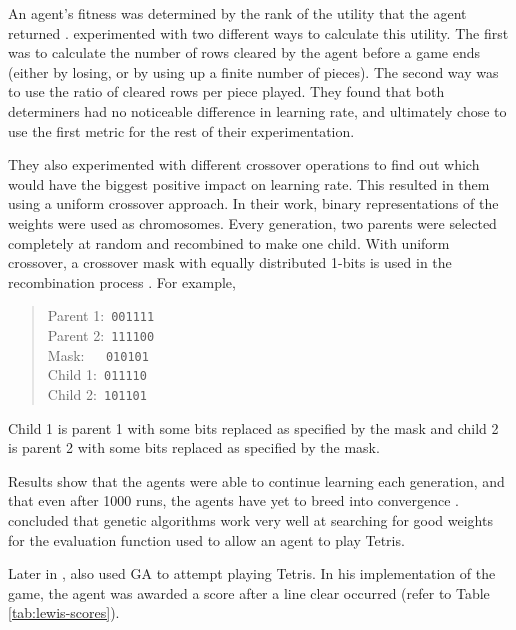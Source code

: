 \documentclass[a4paper, 12pt]{extreport}
\begin{document}
				An agent's fitness was determined by the rank of the utility that the agent returned \cite{tetris-ga-flom-robinson}. \citeauthor{tetris-ga-flom-robinson} experimented with two different ways to calculate this utility. The first was to calculate the number of rows cleared by the agent before a game ends (either by losing, or by using up a finite number of pieces). The second way was to use the ratio of cleared rows per piece played. They found that both determiners had no noticeable difference in learning rate, and ultimately chose to use the first metric for the rest of their experimentation.
				
				They also experimented with different crossover operations to find out which would have the biggest positive impact on learning rate. This resulted in them using a uniform crossover approach. In their work, binary representations of the weights were used as chromosomes. Every generation, two parents were selected completely at random and recombined to make one child. With uniform crossover, a crossover mask with equally distributed 1-bits is used in the recombination process \cite{uniform-crossover}. For example,
				
				\begin{quote}
					Parent 1:\verb| 001111|\\
					Parent 2:\verb| 111100|\\
					Mask:\hspace{4pt}\verb|   010101|\\
					Child 1:\hspace{6pt}\verb| 011110|\\
					Child 2:\hspace{6pt}\verb| 101101|
				\end{quote}
				
				\noindent Child 1 is parent 1 with some bits replaced as specified by the mask and child 2 is parent 2 with some bits replaced as specified by the mask.
				
				Results show that the agents were able to continue learning each generation, and that even after 1000 runs, the agents have yet to breed into convergence  \cite{tetris-ga-flom-robinson}. \citeauthor{tetris-ga-flom-robinson} concluded that genetic algorithms work very well at searching for good weights for the evaluation function used to allow an agent to play Tetris.
				
				Later in \citeyear{tetris-ga-lewis}, \citeauthor{tetris-ga-lewis} \cite{tetris-ga-lewis} also used GA to attempt playing Tetris. In his implementation of the game, the agent was awarded a score after a line clear occurred (refer to Table \ref{tab:lewis-scores}). 
				
\end{document}
